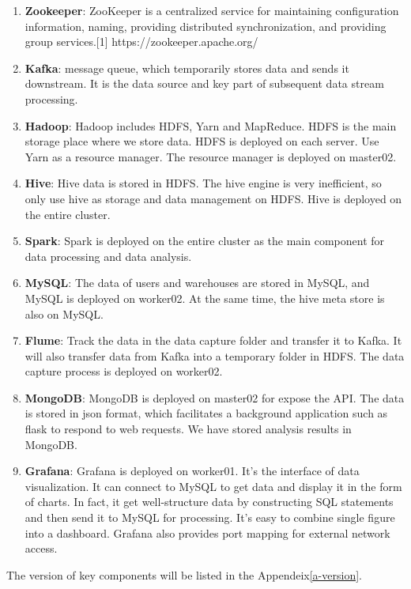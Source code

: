 \begin{enumerate}
    \item \textbf{Zookeeper}: ZooKeeper is a centralized service for maintaining configuration information, naming, providing distributed synchronization, and providing group services.[1] https://zookeeper.apache.org/
    \item \textbf{Kafka}: message queue, which temporarily stores data and sends it downstream. It is the data source and key part of subsequent data stream processing.
    \item \textbf{Hadoop}: Hadoop includes HDFS, Yarn and MapReduce. HDFS is the main storage place where we store data. HDFS is deployed on each server. Use Yarn as a resource manager. The resource manager is deployed on master02.
    \item \textbf{Hive}: Hive data is stored in HDFS. The hive engine is very inefficient, so only use hive as storage and data management on HDFS. Hive is deployed on the entire cluster.
    \item \textbf{Spark}: Spark is deployed on the entire cluster as the main component for data processing and data analysis.
    \item \textbf{MySQL}: The data of users and warehouses are stored in MySQL, and MySQL is deployed on worker02. At the same time, the hive meta store is also on MySQL.
    \item \textbf{Flume}: Track the data in the data capture folder and transfer it to Kafka. It will also transfer data from Kafka into a temporary folder in HDFS. The data capture process is deployed on worker02.
    \item \textbf{MongoDB}: MongoDB is deployed on master02 for expose the API. The data is stored in json format, which facilitates a background application such as flask to respond to web requests. We have stored analysis results in MongoDB.
    \item \textbf{Grafana}: Grafana is deployed on worker01. It's the interface of data visualization. It can connect to MySQL to get data and display it in the form of charts. In fact, it get well-structure data by constructing SQL statements and then send it to MySQL for processing. It's easy to combine single figure into a  dashboard. Grafana also provides port mapping for external network access.
\end{enumerate}


The version of key components will be listed in the Appendeix\ref{a-version}.



